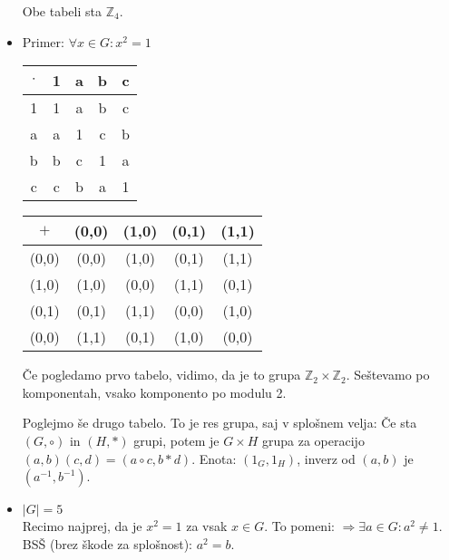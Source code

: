 \documentclass[a4paper,12pt]{article}
\begin{document}
\begin{itemize}
Obe tabeli sta $\mathbb{Z}_4$. \\

\item Primer: $\forall x \in G: x^2=1$
\begin{table}[!hpb]
\begin{minipage}[b]{0.45\linewidth}
\centering
\begin{tabular}{c|cccc}
$\cdot$ & 1 & a & b & c \\
\hline
1 & 1 & a & b & c \\
a & a & 1 & c & b \\
b & b & c & 1 & a \\
c & c & b & a & 1 \\
\end{tabular}
\end{minipage}
\hspace{0.5cm}
\begin{minipage}[b]{0.45\linewidth}
\centering
\begin{tabular}{c|cccc}
$+$ & (0,0) & (1,0) & (0,1) & (1,1) \\
\hline
(0,0) & (0,0) & (1,0) & (0,1) & (1,1) \\
(1,0) & (1,0) & (0,0) & (1,1) & (0,1) \\
(0,1) & (0,1) & (1,1) & (0,0) & (1,0) \\
(0,0) & (1,1) & (0,1) & (1,0) & (0,0) \\
\end{tabular}
\end{minipage}
\end{table}

Če pogledamo prvo tabelo, vidimo, da je to grupa $\mathbb{Z}_2 \times \mathbb{Z}_2$. Seštevamo po komponentah, vsako komponento po modulu 2.

 Poglejmo še drugo tabelo. To je res grupa, saj v splošnem velja: Če sta $(G,\circ)$ in $(H,*)$ grupi, potem je $G\times H$ grupa za operacijo $(a,b)(c,d)=(a\circ c, b * d)$. \linebreak Enota: $(1_G,1_H)$, inverz od $(a,b)$ je $(a^{-1},b^{-1})$.\\

\item $|G|=5$ \\

Recimo najprej, da je $x^2=1$ za vsak $x \in G$. To pomeni: $\Rightarrow \exists a \in G: a^2\neq 1$. BSŠ (brez škode za splošnost): $a^2=b$.


\end{itemize}
\end{document}
